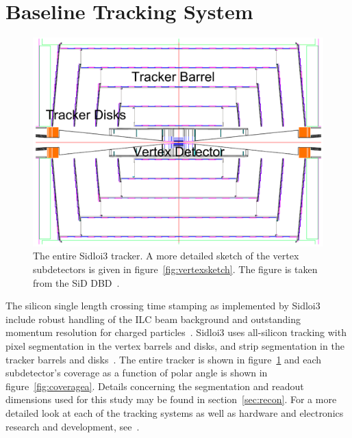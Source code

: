 \section{Baseline Tracking System}
\begin{figure}
\centering
\includegraphics{totalTracker.png}
\caption{The entire Sidloi3 tracker. A more detailed sketch
of the vertex subdetectors is given in figure~\ref{fig:vertexsketch}.
The figure is taken from the SiD DBD~\cite{Behnke:2013lya}.}
\label{fig:trackersketch}
\end{figure}
The silicon single length crossing time stamping as implemented by 
Sidloi3 include robust handling of the ILC
 beam background and outstanding momentum resolution for charged particles~\cite{Behnke:2013lya}.
Sidloi3 uses all-silicon tracking with %
pixel segmentation in the vertex barrels and disks, 
and strip segmentation in the tracker barrels and disks~\cite{Behnke:2013lya}.
The entire tracker is shown in figure~\ref{fig:trackersketch} and
each subdetector's coverage as a function of polar angle is shown in figure~\ref{fig:coveragea}.
Details concerning the segmentation and readout dimensions 
used for this study may be found in section~\ref{sec:recon}.
For a more detailed look at each of the tracking systems
as well as hardware and electronics research and development,
see~\cite{Behnke:2013lya}.


